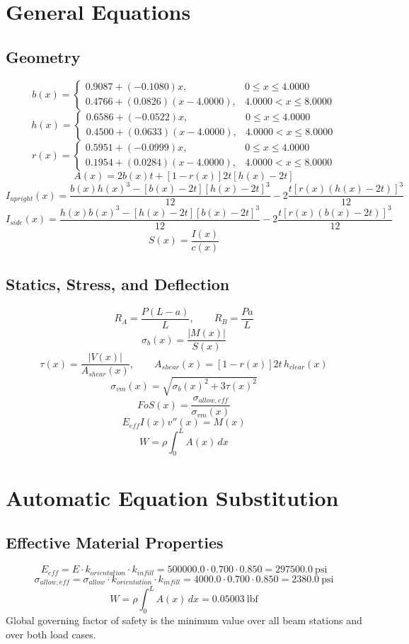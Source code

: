 \documentclass[11pt]{article}
\begin{document}
\section*{General Equations}
\subsection*{Geometry}
\[
b(x)=\begin{cases}0.9087 + (-0.1080)x, & 0 \le x \le 4.0000\\0.4766 + (0.0826)(x-4.0000), & 4.0000 < x \le 8.0000\end{cases}
\]
\[
h(x)=\begin{cases}0.6586 + (-0.0522)x, & 0 \le x \le 4.0000\\0.4500 + (0.0633)(x-4.0000), & 4.0000 < x \le 8.0000\end{cases}
\]
\[
r(x)=\begin{cases}0.5951 + (-0.0999)x, & 0 \le x \le 4.0000\\0.1954 + (0.0284)(x-4.0000), & 4.0000 < x \le 8.0000\end{cases}
\]
\[
A(x)=2b(x)t+[1-r(x)]2t[h(x)-2t]
\]
\[
I_{upright}(x)=\frac{b(x)h(x)^3-[b(x)-2t][h(x)-2t]^3}{12}-2\frac{t[r(x)(h(x)-2t)]^3}{12}
\]
\[
I_{side}(x)=\frac{h(x)b(x)^3-[h(x)-2t][b(x)-2t]^3}{12}-2\frac{t[r(x)(b(x)-2t)]^3}{12}
\]
\[
S(x)=\frac{I(x)}{c(x)}
\]

\subsection*{Statics, Stress, and Deflection}
\[
R_A=\frac{P(L-a)}{L}, \qquad R_B=\frac{Pa}{L}
\]
\[
\sigma_b(x)=\frac{|M(x)|}{S(x)}
\]
\[
\tau(x)=\frac{|V(x)|}{A_{shear}(x)}, \qquad A_{shear}(x)=[1-r(x)]2t\,h_{clear}(x)
\]
\[
\sigma_{vm}(x)=\sqrt{\sigma_b(x)^2+3\tau(x)^2}
\]
\[
FoS(x)=\frac{\sigma_{allow,eff}}{\sigma_{vm}(x)}
\]
\[
E_{eff}I(x)v''(x)=M(x)
\]
\[
W=\rho\int_0^L A(x)\,dx
\]

\section*{Automatic Equation Substitution}
\subsection*{Effective Material Properties}
\[E_{eff} = E \cdot k_{orientation} \cdot k_{infill} = 500000.0 \cdot 0.700 \cdot 0.850 = 297500.0\ \mathrm{psi}\]
\[\sigma_{allow,eff} = \sigma_{allow} \cdot k_{orientation} \cdot k_{infill} = 4000.0 \cdot 0.700 \cdot 0.850 = 2380.0\ \mathrm{psi}\]
\[W = \rho \int_0^L A(x)\,dx = 0.05003\ \mathrm{lbf}\]
Global governing factor of safety is the minimum value over all beam stations and over both load cases.
\end{document}
